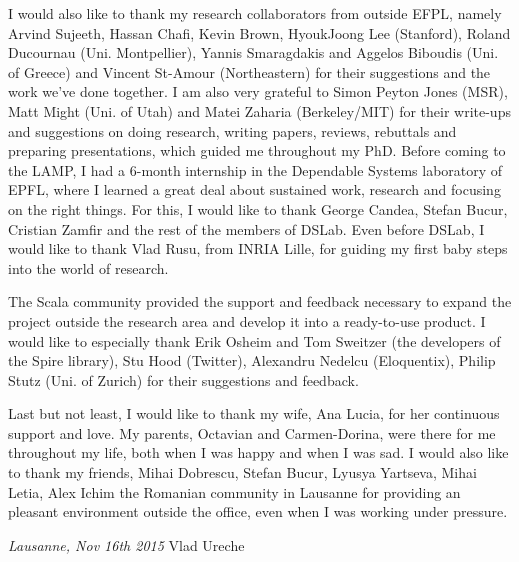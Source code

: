 I would also like to thank my research collaborators from outside EFPL, namely Arvind Sujeeth, Hassan Chafi, Kevin Brown, HyoukJoong Lee (Stanford), Roland Ducournau (Uni. Montpellier), Yannis Smaragdakis and Aggelos Biboudis (Uni. of Greece) and Vincent St-Amour (Northeastern) for their suggestions and the work we've done together. I am also very grateful to Simon Peyton Jones (MSR), Matt Might (Uni. of Utah) and Matei Zaharia (Berkeley/MIT) for their write-ups and suggestions on doing research, writing papers, reviews, rebuttals and preparing presentations, which guided me throughout my PhD. Before coming to the LAMP, I had a 6-month internship in the Dependable Systems laboratory of EPFL, where I learned a great deal about sustained work, research and focusing on the right things. For this, I would like to thank George Candea, Stefan Bucur, Cristian Zamfir and the rest of the members of DSLab. Even before DSLab, I would like to thank Vlad Rusu, from INRIA Lille, for guiding my first baby steps into the world of research.

\vspace{0.5em}

The Scala community provided the support and feedback necessary to expand the project outside the research area and develop it into a ready-to-use product. I would like to especially thank Erik Osheim and Tom Sweitzer (the developers of the Spire library), Stu Hood (Twitter), Alexandru Nedelcu (Eloquentix), Philip Stutz (Uni. of Zurich) for their suggestions and feedback.

\vspace{0.5em}

Last but not least, I would like to thank my wife, Ana Lucia, for her continuous support and love. My parents, Octavian and Carmen-Dorina, were there for me throughout my life, both when I was happy and when I was sad. I would also like to thank my friends, Mihai Dobrescu, Stefan Bucur, Lyusya Yartseva, Mihai Letia, Alex Ichim the Romanian community in Lausanne for providing an pleasant environment outside the office, even when I was working under pressure.

\bigskip

\noindent\textit{Lausanne, Nov 16th 2015}
\hfill Vlad Ureche
